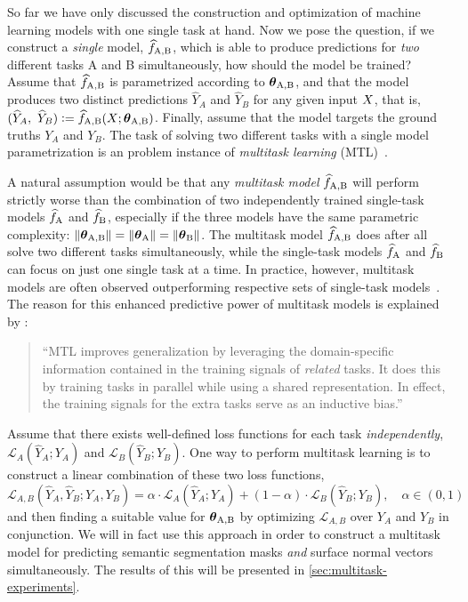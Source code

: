 So far we have only discussed the construction and optimization of machine learning models with one single task at hand.
Now we pose the question, if we construct a \emph{single} model, $\widehat{f}_{\mathrm{A,B}}$, which is able to produce predictions for \emph{two} different tasks A and B simultaneously, how should the model be trained?
Assume that $\widehat{f}_{\mathrm{A,B}}$ is parametrized according to $\boldsymbol{\theta}_{\mathrm{A,B}}$, and that the model produces two distinct predictions $\widehat{Y}_A$ and $\widehat{Y}_B$ for any given input $X$, that is, $(\widehat{Y}_A,~\widehat{Y}_B) \vcentcolon= \widehat{f}_{\mathrm{A,B}}(X; \boldsymbol{\theta}_{\mathrm{A,B}})$.
Finally, assume that the model targets the ground truths $Y_A$ and $Y_B$.
The task of solving two different tasks with a single model parametrization is an problem instance of \textit{multitask learning} (MTL)~\cite{multitask-learning}.

A natural assumption would be that any \textit{multitask model} $\widehat{f}_{\mathrm{A,B}}$ will perform strictly worse than the combination of two independently trained single-task models $\widehat{f}_{\mathrm{A}}$ and $\widehat{f}_{\mathrm{B}}$, especially if the three models have the same parametric complexity: $\left\lVert\boldsymbol{\theta}_{\mathrm{A,B}}\right\rVert = \left\lVert\boldsymbol{\theta}_{\mathrm{A}}\right\rVert = \left\lVert\boldsymbol{\theta}_{\mathrm{B}}\right\rVert$.
The multitask model $\widehat{f}_{\mathrm{A,B}}$ does after all solve two different tasks simultaneously, while the single-task models $\widehat{f}_{\mathrm{A}}$ and $\widehat{f}_{\mathrm{B}}$ can focus on just one single task at a time.
In practice, however, multitask models are often observed outperforming respective sets of single-task models~\cite[Section 2]{multitask-learning}.
The reason for this enhanced predictive power of multitask models is explained by \citeauthor{multitask-learning}:
\begin{quotation}
  \enquote{MTL improves generalization by leveraging the domain-specific information contained in the training signals of \textit{related} tasks. It does this by training tasks in parallel while using a shared representation. In effect, the training signals for the extra tasks serve as an inductive bias.}~\cite[p.~41]{multitask-learning}
\end{quotation}

Assume that there exists well-defined loss functions for each task \emph{independently}, $\mathcal{L}_A(\widehat{Y}_A; Y_A)$ and $\mathcal{L}_B(\widehat{Y}_B; Y_B)$.
One way to perform multitask learning is to construct a linear combination of these two loss functions,
\begin{equation*}
  \mathcal{L}_{A,B}\left(\widehat{Y}_A, \widehat{Y}_B; Y_A, Y_B\right)
  =
  \alpha \cdot \mathcal{L}_A(\widehat{Y}_A; Y_A)
  +
  (1 - \alpha) \cdot \mathcal{L}_B(\widehat{Y}_B; Y_B),
  \quad \alpha \in (0, 1)
\end{equation*}
and then finding a suitable value for $\boldsymbol{\theta}_{\mathrm{A,B}}$ by optimizing $\mathcal{L}_{A,B}$ over $Y_A$ and $Y_B$ in conjunction.
We will in fact use this approach in order to construct a multitask model for predicting semantic segmentation masks \emph{and} surface normal vectors simultaneously.
The results of this will be presented in \cref{sec:multitask-experiments}.
